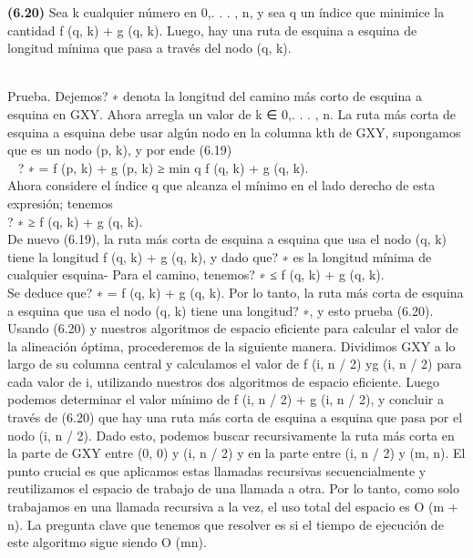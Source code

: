 \documentclass[a4paper]{article}
\begin{document}
\colorbox{mygray}{\parbox{15cm}{
\textbf{(6.20)} Sea k cualquier número en {0,. . . , n}, y sea q un índice que minimice la cantidad f (q, k) + g (q, k). Luego, hay una ruta de esquina a esquina de longitud mínima que pasa a través del nodo (q, k).}}\\

Prueba. Dejemos? ∗ denota la longitud del camino más corto de esquina a esquina en GXY. Ahora arregla un valor de k ∈ {0,. . . , n}. La ruta más corta de esquina a esquina debe usar algún nodo en la columna kth de GXY, supongamos que es un nodo (p, k), y por ende (6.19)\\

  ? ∗ = f (p, k) + g (p, k) ≥ min q f (q, k) + g (q, k).\\

Ahora considere el índice q que alcanza el mínimo en el lado derecho de esta expresión; tenemos\\

? ∗ ≥ f (q, k) + g (q, k).\\

De nuevo (6.19), la ruta más corta de esquina a esquina que usa el nodo (q, k) tiene la longitud f (q, k) + g (q, k), y dado que? ∗ es la longitud mínima de cualquier esquina- Para el camino, tenemos? ∗ ≤ f (q, k) + g (q, k).\\

Se deduce que? ∗ = f (q, k) + g (q, k). Por lo tanto, la ruta más corta de esquina a esquina que usa el nodo (q, k) tiene una longitud? ∗, y esto prueba (6.20).\\

Usando (6.20) y nuestros algoritmos de espacio eficiente para calcular el valor de la alineación óptima, procederemos de la siguiente manera. Dividimos GXY a lo largo de su columna central y calculamos el valor de f (i, n / 2) yg (i, n / 2) para cada valor de i, utilizando nuestros dos algoritmos de espacio eficiente. Luego podemos determinar el valor mínimo de f (i, n / 2) + g (i, n / 2), y concluir a través de (6.20) que hay una ruta más corta de esquina a esquina que pasa por el nodo (i, n / 2). Dado esto, podemos buscar recursivamente la ruta más corta en la parte de GXY entre (0, 0) y (i, n / 2) y en la parte entre (i, n / 2) y (m, n). El punto crucial es que aplicamos estas llamadas recursivas secuencialmente y reutilizamos el espacio de trabajo de una llamada a otra. Por lo tanto, como solo trabajamos en una llamada recursiva a la vez, el uso total del espacio es O (m + n). La pregunta clave que tenemos que resolver es si el tiempo de ejecución de este algoritmo sigue siendo O (mn).\\
\end{document}

